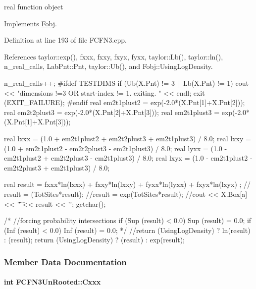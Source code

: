real function object 



\-Implements \hyperlink{classFobj_a7e89aa4918cf8e40683dde607257d1ee}{\-Fobj}.



\-Definition at line 193 of file \-F\-C\-F\-N3.\-cpp.



\-References taylor\-::exp(), fxxx, fxxy, fxyx, fyxx, taylor\-::\-Lb(), taylor\-::ln(), n\-\_\-real\-\_\-calls, \-Lab\-Pnt\-::\-Pnt, taylor\-::\-Ub(), and \-Fobj\-::\-Using\-Log\-Density.


\begin{DoxyCode}
{
  n_real_calls++;
  #ifdef TESTDIMS
  if (Ub(X.Pnt) != 3 || Lb(X.Pnt) != 1)
  {
    cout << "dimensions !=3 OR start-index != 1. exiting. " << endl;
    exit (EXIT_FAILURE);
  }
  #endif
  real em2t1plust2 = exp(-2.0*(X.Pnt[1]+X.Pnt[2]));
  real em2t2plust3 = exp(-2.0*(X.Pnt[2]+X.Pnt[3]));
  real em2t1plust3 = exp(-2.0*(X.Pnt[1]+X.Pnt[3]));

  real lxxx = (1.0 + em2t1plust2 + em2t2plust3 + em2t1plust3) / 8.0;
  real lxxy = (1.0 + em2t1plust2 - em2t2plust3 - em2t1plust3) / 8.0;
  real lyxx = (1.0 - em2t1plust2 + em2t2plust3 - em2t1plust3) / 8.0;
  real lxyx = (1.0 - em2t1plust2 - em2t2plust3 + em2t1plust3) / 8.0;

  real result = fxxx*ln(lxxx) + fxxy*ln(lxxy) + fyxx*ln(lyxx) + fxyx*ln(lxyx) ;
  // result = (TotSites*result);
  //result = exp(TotSites*result);
  //cout << X.Box[a] << '\t' << result << '\n'; getchar();

  /* //forcing probability intersections
  if (Sup (result) < 0.0)
  Sup (result) = 0.0;
  if (Inf (result) < 0.0)
  Inf (result) = 0.0;
  */
  //return (UsingLogDensity) ? ln(result) : (result);
  return (UsingLogDensity) ? (result) : exp(result);
}
\end{DoxyCode}


\subsubsection{\-Member \-Data \-Documentation}
\hypertarget{classFCFN3UnRooted_a52b3db1c0464e43eb76fd9c2f85f3adb}{
\paragraph[{\-Cxxx}]{\setlength{\rightskip}{0pt plus 5cm}int {\bf \-F\-C\-F\-N3\-Un\-Rooted\-::\-Cxxx}}}\label{classFCFN3UnRooted_a52b3db1c0464e43eb76fd9c2f85f3adb}


